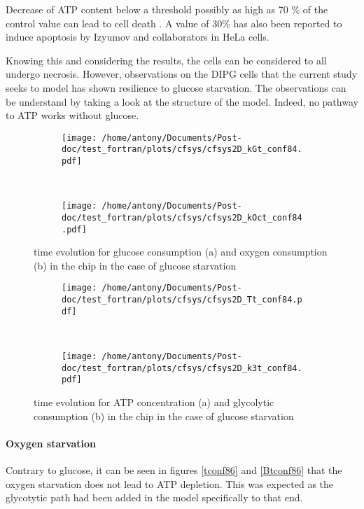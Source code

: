 \documentclass[11pt,a4paper]{article}
\begin{document}
Decrease of ATP content below a threshold possibly as high as 70 \% of the control value can lead to cell death \cite{Lieberthal1998}. A value of 30\% has also been reported to induce apoptosis by Izyumov and collaborators in HeLa cells.\cite{Izyumov2004}

Knowing this and considering the results, the cells can be considered to all undergo necrosis. However, observations on the DIPG cells that the current study seeks to model has shown resilience to glucose starvation. The observations can be understand by taking a look at the structure of the model. Indeed, no pathway to ATP works without glucose.

\begin{figure}[ht!]
	\begin{subfigure}{0.45\textwidth}
	\centering
	\texttt{[image: /home/antony/Documents/Post-doc/test\_fortran/plots/cfsys/cfsys2D\_kGt\_conf84.pdf]}
	\caption{ \label{kGt_conf84}}
	\end{subfigure}
	~~
	\begin{subfigure}{0.45\textwidth}
	\texttt{[image: /home/antony/Documents/Post-doc/test\_fortran/plots/cfsys/cfsys2D\_kOct\_conf84.pdf]}
		\caption{ \label{kOct_conf84}}
	\end{subfigure}
	\caption{time evolution for glucose consumption (a) and  oxygen consumption (b) in the chip in the case of glucose starvation \label{tconf84}}
\end{figure}

\begin{figure}[ht!]
	\begin{subfigure}{0.45\textwidth}
	\centering
	\texttt{[image: /home/antony/Documents/Post-doc/test\_fortran/plots/cfsys/cfsys2D\_Tt\_conf84.pdf]}
	\caption{ \label{Tt_conf84}}
	\end{subfigure}
	~~
	\begin{subfigure}{0.45\textwidth}
	\texttt{[image: /home/antony/Documents/Post-doc/test\_fortran/plots/cfsys/cfsys2D\_k3t\_conf84.pdf]}
		\caption{ \label{k3t_conf84}}
	\end{subfigure}
	\caption{time evolution for ATP concentration (a) and  glycolytic consumption (b) in the chip in the case of glucose starvation \label{Btconf82}}
\end{figure}

\paragraph{Oxygen starvation}
Contrary to glucose, it can be seen in figures \ref{tconf86} and \ref{Btconf86} that the oxygen starvation does not lead to ATP depletion. This was expected as the glycotytic path had been added in the model specifically to that end.
\end{document}
